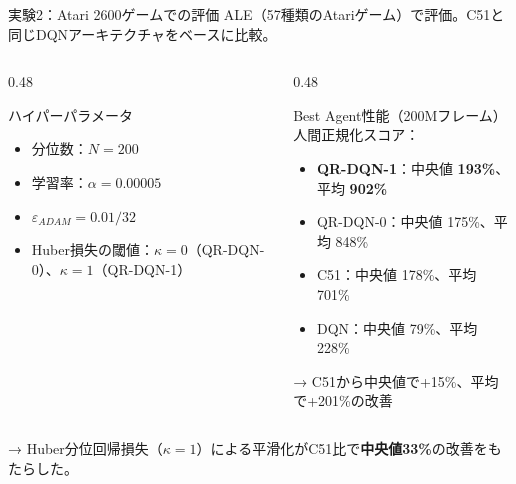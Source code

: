 \documentclass[aspectratio=169, dvipdfmx, 11pt]{beamer}
\newcommand{\green}[1]{\textcolor{green!40!black}{#1}}
\begin{document}
\begin{frame}{実験2：Atari 2600ゲームでの評価}
  ALE（57種類のAtariゲーム）で評価。C51と同じDQNアーキテクチャをベースに比較。
  \vfill
  \begin{columns}[T]
    \begin{column}{0.48\textwidth}
      \begin{block}{ハイパーパラメータ}
        \begin{itemize}
          \item 分位数：$N = 200$
          \item 学習率：$\alpha = 0.00005$
          \item $\varepsilon_{ADAM} = 0.01/32$
          \item Huber損失の閾値：$\kappa = 0$（QR-DQN-0）、$\kappa = 1$（QR-DQN-1）
        \end{itemize}
      \end{block}
    \end{column}
    \begin{column}{0.48\textwidth}
      \begin{alertblock}{Best Agent性能（200Mフレーム）}
        {\small 人間正規化スコア：}
        \begin{itemize}
          \item \textbf{QR-DQN-1}：中央値 \textbf{193\%}、平均 \textbf{902\%}
          \item QR-DQN-0：中央値 175\%、平均 848\%
          \item C51：中央値 178\%、平均 701\%
          \item DQN：中央値 79\%、平均 228\%
        \end{itemize}
        {\small → C51から中央値で\green{+15\%}、平均で\green{+201\%}の改善}
      \end{alertblock}
    \end{column}
  \end{columns}
  \vfill
  {\small → Huber分位回帰損失（$\kappa = 1$）による平滑化がC51比で\textbf{中央値33\%}の改善をもたらした。}
\end{frame}
\end{document}
